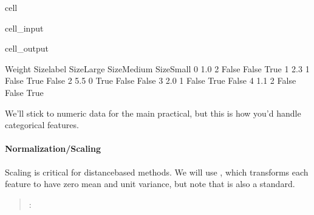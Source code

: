 \documentclass[letterpaper,10pt,english]{jupyterBook}
\begin{document}
\begin{sphinxuseclass}{cell}\begin{sphinxVerbatimInput}

\begin{sphinxuseclass}{cell_input}
\begin{sphinxVerbatim}[commandchars=\\\{\}]
\end{sphinxVerbatim}

\end{sphinxuseclass}\end{sphinxVerbatimInput}
\begin{sphinxVerbatimOutput}

\begin{sphinxuseclass}{cell_output}
\begin{sphinxVerbatim}[commandchars=\\\{\}]
   Weight  Size\PYGZus{}label  Size\PYGZus{}Large  Size\PYGZus{}Medium  Size\PYGZus{}Small
0     1.0           2       False        False        True
1     2.3           1       False         True       False
2     5.5           0        True        False       False
3     2.0           1       False         True       False
4     1.1           2       False        False        True
\end{sphinxVerbatim}

\end{sphinxuseclass}\end{sphinxVerbatimOutput}

\end{sphinxuseclass}
\sphinxAtStartPar
We’ll stick to numeric data for the main practical, but this is how you’d handle categorical features.


\paragraph{Normalization/Scaling}
\label{\detokenize{03:normalization-scaling}}
\sphinxAtStartPar
Scaling is critical for distance\sphinxhyphen{}based methods. We will use , which transforms each feature to have zero mean and unit variance, but note that  is also a standard.
\begin{quote}

\sphinxAtStartPar
{}: 
\end{quote}
\end{document}
